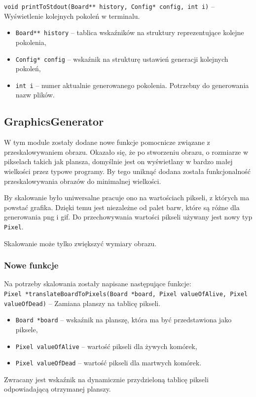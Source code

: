 \documentclass{mwart}
\begin{document}
\noindent{}\texttt{void printToStdout(Board** history, Config* config, int i)} -- Wyświetlenie kolejnych pokoleń w terminalu.
\begin{itemize}[label={}]
	\item\texttt{Board** history} -- tablica wskaźników na struktury reprezentujące kolejne pokolenia,
	\item\texttt{Config* config} -- wskaźnik na strukturę ustawień generacji kolejnych pokoleń,
	\item \texttt{int i} -- numer aktualnie generowanego pokolenia. Potrzebny do generowania nazw plików.
\end{itemize}

\subsection{GraphicsGenerator}
W tym module zostały dodane nowe funkcje pomocnicze związane z przeskalowywaniem obrazu. Okazało się, że po stworzeniu obrazu, o rozmiarze w pikselach takich jak plansza, domyślnie jest on wyświetlany w bardzo małej wielkości przez typowe programy. By tego uniknąć dodana została funkcjonalność przeskalowywania obrazów do minimalnej wielkości.

By skalowanie było uniwersalne pracuje ono na wartościach pikseli, z których ma powstać grafika. Dzięki temu jest niezależne od palet barw, które są różne dla generowania png i gif. Do przechowywania wartości pikseli używany jest nowy typ \texttt{Pixel}.

Skalowanie może tylko zwiększyć wymiary obrazu.

\subsubsection{Nowe funkcje}
Na potrzeby skalowania zostały napisane następujące funkcje:\\
\noindent{}\texttt{Pixel *translateBoardToPixels(Board *board, Pixel valueOfAlive, Pixel valueOfDead)} -- Zamiana planszy na tablicę pikseli.
\begin{itemize}[label={}]
	\item\texttt{Board *board} -- wskaźnik na planszę, która ma być przedstawiona jako piksele,
	\item\texttt{Pixel valueOfAlive} -- wartość pikseli dla żywych komórek,
	\item \texttt{Pixel valueOfDead} -- wartość pikseli dla martwych komórek.
\end{itemize}
Zwracany jest wskaźnik na dynamicznie przydzieloną tablicę pikseli odpowiadającą otrzymanej planszy.\\
\end{document}
